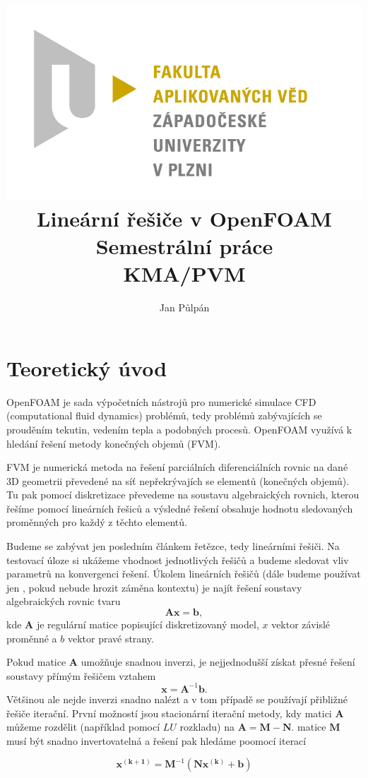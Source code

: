 \documentclass[a4paper,12pt]{report}
\title{
	{\includegraphics[width=\linewidth]{FAV_logo.jpg}}\\[2cm]
	{Lineární řešiče v OpenFOAM}\\	
	{\small{Semestrální práce}}\\
	{\small{KMA/PVM}}\\
}
\author{Jan Půlpán}
\theoremstyle{remark}
\begin{document}
	\maketitle

	{\let\clearpage\relax \chapter{Teoretický úvod}}



	
	OpenFOAM je sada výpočetních nástrojů pro numerické simulace CFD (computational fluid dynamics) problémů, tedy problémů zabývajících se prouděním tekutin, vedením tepla a podobných procesů. OpenFOAM využívá k hledání řešení metody konečných objemů (FVM). 
	
	FVM je numerická metoda na řešení parciálních diferenciálních rovnic na dané 3D geometrii převedené na síť nepřekrývajích se elementů (konečných objemů). Tu pak pomocí diskretizace převedeme na soustavu algebraických rovnich, kterou řešíme pomocí lineárních řešiců a výsledné řešení obsahuje hodnotu sledovaných proměnných pro každý z těchto elementů.
	
	Budeme se zabývat jen posledním článkem řetězce, tedy lineárními řešiči. Na testovací úloze si ukážeme vhodnost jednotlivých řešičů a budeme sledovat vliv parametrů na konvergenci řešení. Úkolem lineárních řešičů (dále budeme používat jen , pokud nebude hrozit záměna kontextu) je najít řešení soustavy algebraických rovnic tvaru
	\begin{equation}
		\boldsymbol{A}\boldsymbol{x} = \boldsymbol{b},
		\label{eq:linear_set}
	\end{equation}
	kde $\boldsymbol{A}$ je regulární matice popisující diskretizovaný model, $x$ vektor závislé proměnné a $b$ vektor pravé strany. 
	
	Pokud matice $\boldsymbol{A}$ umožňuje snadnou inverzi, je nejjednodušší získat přesné řešení soustavy přímým řešičem vztahem 
	$$ \boldsymbol{x} = \boldsymbol{A}^{-1} \boldsymbol{b}.$$ 
	Většinou ale nejde inverzi snadno nalézt a v tom případě se používají přibližné řešiče iterační. První možností jsou stacionární iterační metody, kdy matici $\boldsymbol{A}$ můžeme rozdělit (například pomocí $LU$ rozkladu) na $\boldsymbol{A} = \boldsymbol{M} - \boldsymbol{N}$. matice $\pmb{M}$ musí být snadno invertovatelná a řešení pak hledáme poomocí iterací 
	
	\begin{equation}
		\boldsymbol{x^{(k+1)}} = \boldsymbol{M}^{-1}(\boldsymbol{N}\boldsymbol{x^{(k)}} + \boldsymbol{b})
		\label{eq:stat_iter}
	\end{equation}
\end{document}
